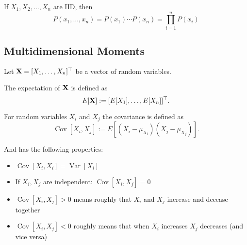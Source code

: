 \begin{remark}
If \(X_1, X_2, \ldots, X_n\) are IID, then \[
P(x_1, \ldots, x_n) = P(x_1) \cdots P(x_n) = \prod_{i=1}^n P(x_i)
\]
\end{remark}

\subsection{Multidimensional Moments}
Let \(\boldsymbol{\mathrm{X}} = [X_1, \ldots, X_n]^\top\) be a vector of random variables.

\begin{definition}[Expectation]
The expectation of \(\boldsymbol{\mathrm{X}}\) is defined as
\[
E[\boldsymbol{\mathrm{X}}] := [E[X_1], \ldots, E[X_n]]^\top.
\]
\end{definition}

\begin{definition}[Covariance]
For random variables \(X_i\) and \(X_j\) the covariance is defined as
\[
\operatorname{Cov}[X_i, X_j] := E[(X_i - \mu_{X_i})(X_j - \mu_{X_j})].
\]

And has the following properties:
\begin{itemize}
\item \(\operatorname{Cov}[X_i, X_i] = \operatorname{Var}[X_i]\)
\item If \(X_i, X_j\) are independent: \(\operatorname{Cov}[X_i, X_j] = 0\)
\item \(\operatorname{Cov}[X_i, X_j] > 0\) means roughly that \(X_i\) and \(X_j\) increase and decease together
\item \(\operatorname{Cov}[X_i, X_j] < 0\) roughly means that when \(X_i\) increases \(X_j\) decreases (and vice versa)
\end{itemize}
\end{definition}

